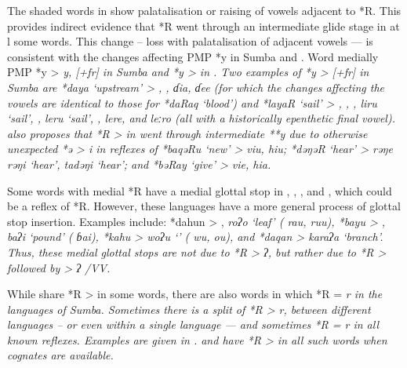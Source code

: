 The shaded words in  show palatalisation or raising
of vowels adjacent to *R.
This provides indirect evidence that *R went through an intermediate
glide stage in at l some words.
This change -- loss with palatalisation of adjacent vowels ---
is consistent with the changes affecting PMP *y in Sumba and .
Word medially PMP *y > \it{y,} {\0}[+fr] in Sumba
and *y > {\0} in .
Two examples of *y > {\0}[+fr] in Sumba are *daya ‘upstream’
>  ,
,  \it{ɗia},  \it{ɗee} (for which the changes
affecting the vowels are identical to those for *daRaq ‘blood’)
and *layaR ‘sail’ > ,
, ,  \it{liru} ‘sail’, ,
 \it{leru} ‘sail’, ,
 \it{lere}, and  \it{leːro} (all with a historically epenthetic final vowel).
\citet[69]{Blust2008} also proposes that *R > {\0} in  went
through intermediate **y due to otherwise unexpected *ə > \it{i}
in reflexes of *baqəRu ‘new’ >  \it{viu,}  \it{hiu};
*dəŋəR ‘hear’ >  \it{rəŋe {\tl} rəŋi} ‘hear',  \it{tadəŋi} ‘hear’;
and *bəRay ‘give’ >  \it{vie},  \it{hia}.

Some words with medial *R have a medial glottal stop in ,
, , and , which could be a reflex of *R.
However, these languages have a more general process of glottal stop insertion.
Examples include: *dahun > ,
 \it{roʔo} ‘leaf’ ( \it{rau,
ruu}), *bayu > ,  \it{baʔi} ‘pound’ ( \it{ɓai}),
*kahu >  \it{woʔu} ‘’ ( \it{wu,} 
\it{ou)}, and *daqan >  \it{karaʔa} ‘branch’.
Thus, these medial glottal stops are not due to *R > \it{ʔ},
but rather due to *R > {\0} followed by {\0} > \it{ʔ} /V{\gap}V.

\clearpage
While  share *R > {\0} in some words,
there are also words in which *R = \it{r} in the languages of Sumba.
Sometimes there is a split of *R > \it{r,} {\0} between different
languages -- or even within a single language ---
and sometimes *R = \it{r} in all known reflexes.
Examples are given in .
 and  have *R > {\0} in all such words when cognates are available.

